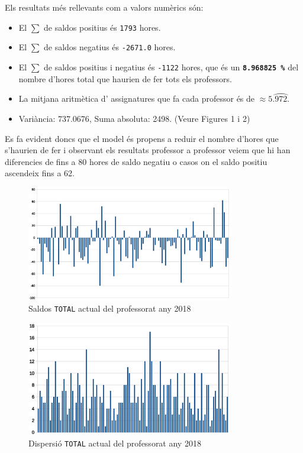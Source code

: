 \documentclass[10pt,twocolumn]{article}
\begin{document}
Els resultats més rellevants com a valors numèrics són:
\begin{itemize}
	\item El $\sum$ de saldos positius és \texttt{1793} hores.	
	\item El $\sum$ de saldos negatius és \texttt{-2671.0} hores.	
	\item El $\sum$ de saldos positius i negatius  és \texttt{-1122} hores, que és un \texttt{\textbf{8.968825 \%}} del nombre d'hores total que haurien de fer tots els professors.
	\item La mitjana aritmètica d' assignatures que fa cada professor és de $\approx 5. \wideparen{972}$.
	\item Variància: 737.0676, Suma absoluta: 2498. (Veure Figures 1 i 2)
\end{itemize}
Es fa evident doncs que el model és propens a reduir el nombre d'hores que s'haurien de fer i observant els resultats professor a professor veiem que hi han diferencies de fins a 80 hores de saldo negatiu o casos on el saldo positiu ascendeix fins a 62.
\begin{figure}
\centering
\includegraphics[width=9cm]{D_ma}
\caption{Saldos \texttt{TOTAL} actual del professorat any 2018}
\label{fig:1}
\end{figure}
\begin{figure}
	\centering
	\includegraphics[width=9cm]{dis_ma}
	\caption{Dispersió \texttt{TOTAL} actual del professorat any 2018}
	\label{fig:2}
\end{figure}
\end{document}
